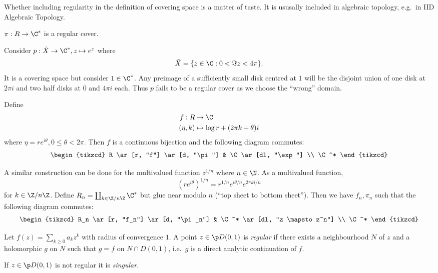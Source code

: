 \documentclass[a4paper]{article}
\begin{document}
\begin{note}
  Whether including regularity in the definition of covering space is a matter of taste. It is ususally included in algebraic topology, e.g.\ in IID Algebraic Topology.
\end{note}

\begin{remark}
  \(\pi: R \to \C^*\) is a regular cover.
\end{remark}

\begin{eg}
  Consider \(p: \tilde X \to \C^*, z \mapsto e^z\) where
  \[
    \tilde X = \{z \in \C: 0 < \Im z < 4\pi\}.
  \]
  It is a covering space but consider \(1 \in \C^*\). Any preimage of a sufficiently small disk centred at \(1\) will be the disjoint union of one disk at \(2\pi i\) and two half disks at \(0\) and \(4\pi i\) each. Thus \(p\) fails to be a regular cover as we choose the ``wrong'' domain.
\end{eg}

Define
\begin{align*}
  f: R &\to \C \\
  (\eta, k) &\mapsto \log r + (2\pi k + \theta) i
\end{align*}
where \(\eta = re^{i\theta}, 0 \leq \theta < 2\pi\). Then \(f\) is a continuous bijection and the following diagram commutes:
\[
  \begin{tikzcd}
    R \ar[r, "f"] \ar[d, "\pi"] & \C \ar[dl, "\exp"] \\
    \C^*
  \end{tikzcd}
\]

A similar construction can be done for the multivalued function \(z^{1/n}\) where \(n \in \N\). As a multivalued function,
\[
  (r e^{i\theta})^{1/n} = r^{1/n} e^{i\theta/n} e^{2\pi ki/n}
\]
for \(k \in \Z/n\Z\). Define \(R_n = \coprod_{k \in \Z/n\Z} \C^*\) but glue near modulo \(n\) (``top sheet to bottom sheet''). Then we have \(f_n, \pi_n\) such that the following diagram commutes:
\[
  \begin{tikzcd}
    R_n \ar[r, "f_n"] \ar[d, "\pi_n"] & \C^* \ar[dl, "z \mapsto z^n"] \\
    \C^*
  \end{tikzcd}
\]

\begin{definition}
  Let \(f(z) = \sum_{k \geq 0} a_k z^k\) with radius of convergence \(1\). A point \(z \in \p D(0, 1)\) is \emph{regular} if there exists a neighbourhood \(N\) of \(z\) and a holomorphic \(g\) on \(N\) such that \(g = f\) on \(N \cap D(0, 1)\), i.e.\ \(g\) is a direct analytic continuation of \(f\).

  If \(z \in \p D(0, 1)\) is not regular it is \emph{singular}.
\end{definition}
\end{document}
